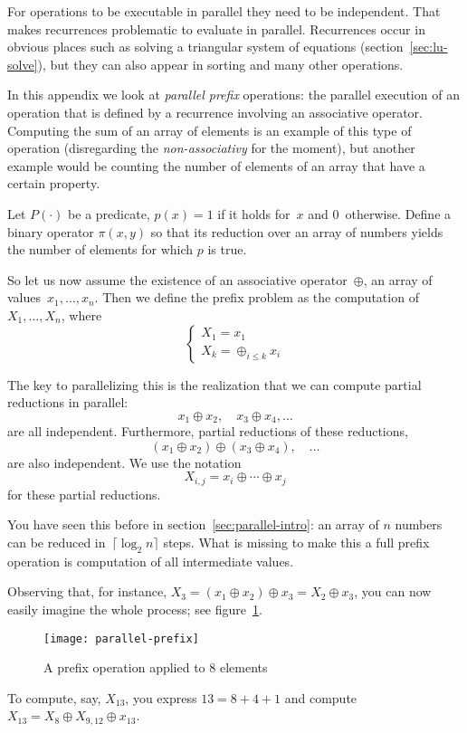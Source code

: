 For operations to be executable in parallel they need to be independent.
That makes recurrences problematic to evaluate in parallel.
Recurrences occur in obvious places such as solving a triangular system 
of equations (section~\ref{sec:lu-solve}),
but they can also appear in sorting and many other operations.

In this appendix we look at \emph{parallel prefix} operations: the
parallel execution of an operation that is defined by a recurrence
involving an associative operator.  Computing the sum of an array of
elements is an example of this type of operation (disregarding the
\emph{non-associativy} for the moment), but
another example would be counting the number of elements
of an array that have a certain property.

\begin{exercise}
  Let $P(\cdot)$ be a predicate, $p(x)=1$ if it holds for~$x$
  and 0~otherwise. Define a binary operator $\pi(x,y)$ so that
  its reduction over an array of numbers yields the number of 
  elements for which $p$ is true.
\end{exercise}

So let us now assume the existence of an associative operator~$\oplus$,
an array of values~$x_1,\ldots,x_n$. Then we define the prefix problem
as the computation of $X_1,\ldots,X_n$, where
\[
\begin{cases}
  X_1=x_1\\
  X_k=\oplus_{i\leq k} x_i
\end{cases}
\]

The key to parallelizing this is the realization that we can compute 
partial reductions in parallel:
\[ x_1\oplus x_2, \quad x_3\oplus x_4, \ldots \]
are all independent.
Furthermore, partial reductions of these reductions,
\[ (x_1\oplus x_2) \oplus (x_3\oplus x_4),\quad \ldots \]
are also independent. We use the notation 
\[ X_{i,j}=x_i\oplus\cdots\oplus x_j \]
for these partial reductions.

You have seen this before in section~\ref{sec:parallel-intro}:
an array of $n$ numbers can be reduced in~$\lceil \log_2 n\rceil$ 
steps.
What is missing to make this a full prefix operation
is computation of all intermediate values. 

Observing that, for instance, $X_3=(x_1\oplus x_2)\oplus x_3=X_2\oplus x_3$,
you can now easily imagine the whole process; see figure~\ref{fig:prefix}.
\begin{figure}[ht]
  \texttt{[image: parallel-prefix]}
  \caption{A prefix operation applied to 8 elements}
  \label{fig:prefix}
\end{figure}
To compute, say, $X_{13}$, you express $13=8+4+1$ and compute
$X_{13}=X_8\oplus X_{9,12} \oplus x_13$.

